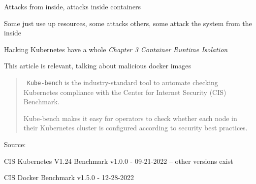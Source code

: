 \documentclass[Screen16to9,17pt]{foils}
\begin{document}
\begin{list2}
\item Attacks from inside, attacks inside containers
\item Some just use up resources, some attacks others, some attack the system from the inside
\item Hacking Kubernetes have a whole \emph{Chapter 3 Container Runtime Isolation}
\end{list2}



This article is relevant, talking about malicious docker images\\




\begin{quote}
\faWrench\ \verb+Kube-bench+ is the industry-standard tool to automate checking Kubernetes compliance with the Center for Internet Security (CIS) Benchmark.

Kube-bench makes it easy for operators to check whether each node in their Kubernetes cluster is configured according to security best practices.
\end{quote}
Source: 

\begin{list2}
\item CIS Kubernetes V1.24 Benchmark v1.0.0 - 09-21-2022 -- other versions exist
\item CIS Docker Benchmark v1.5.0 - 12-28-2022
\end{list2}




\end{document}
